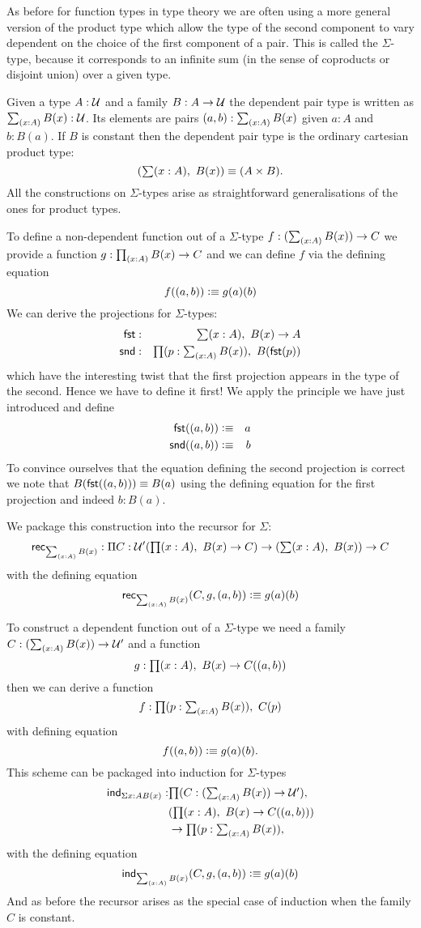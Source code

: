 As before for function types in type theory we are often using a
more general version of the product type which allow the type of
the second component to vary dependent on the choice of the first
component of a pair. This is called the $\Sigma$-type, because it
corresponds to an infinite sum (in the sense of coproducts or
disjoint union) over a given type.

Given a type $A:\mathcal{U}$ and a family $B : A \to \mathcal{U}$ the dependent
pair type is written as $\sm{x:A} B(x) : \UU$. Its elements are
pairs $\tup{a}{b} : \sm{x:A} B(x)$ given $a:A$ and $b:B(a)$.
If $B$ is constant then the dependent pair type is the
ordinary cartesian product type:
\[ (\sm{x:A} B(x)) \jdeq (A \times B).\]
All the constructions on $\Sigma$-types arise as straightforward generalisations of the ones for product types.

To define a non-dependent function out of a $\Sigma$-type
$f : (\sm{x:A} B(x)) \to C$ we provide a function 
$g : \prd{x:A} B(x) \to C$ and we can define $f$ via the defining
equation
\[ f(( a,b)) \vcentcolon\equiv g(a)(b) \]
We can derive the projections for $\Sigma$-types:
\begin{eqnarray*}
  \fst & : & \sm{x : A}B(x) \to A \\
  \snd & : & \prd{p:\sm{x : A}B(x)}B(\fst(p))
\end{eqnarray*}
which have the interesting twist that the first projection appears
in the type of the second. Hence we have to define it first!
We apply the principle we have just introduced and define
\begin{eqnarray*}
  \mathsf{fst}(( a,b)) & \vcentcolon\equiv & a \\
  \mathsf{snd}(( a,b)) & \vcentcolon\equiv & b
\end{eqnarray*}
To convince ourselves that the equation defining the second
projection is correct we note that $B (\mathsf{fst}(( a,b))) \equiv
B(a)$ using the defining equation for the first projection and
indeed $b : B(a)$. 

We package this construction into the recursor for $\Sigma$:
\[ \rec{\sm{x:A}B(x)} : \Pi{C:\UU'}(\prd{x:A} B(x) \to C) \to
(\sm{x:A}B(x)) \to C \]
with the defining equation
\[ \rec{\sm{x:A}B(x)}(C,g,\tup{a}{b}) \defeq g(a)(b) \]

To construct a dependent function out of a $\Sigma$-type we 
need a family $C : (\sm{x:A} B(x)) \to \UU'$ and a function
\[ g : \prd{x:A} B(x) \to C(\tup{a}{b}) \]
then we can derive a function 
\[ f : \prd{p : \sm{x:A}B(x)} C(p) \]
with  defining equation
\[ f(( a,b)) \vcentcolon\equiv g(a)(b).\]
This scheme can be packaged into induction for $\Sigma$-types
\begin{align*}
  \ind{\Sigma{x:A}B(x)} : & \prd{C:(\sm{x:A} B(x)) \to \UU'}\\
   & (\prd{x:A} B(x) \to C(\tup{a}{b})) \\
   & \to \prd{p : \sm{x:A}B(x)}
\end{align*}
with the defining equation 
\[ \ind{\sm{x:A}B(x)}(C,g,\tup{a}{b}) \defeq g(a)(b) \]
And as before the recursor arises as the special case of induction
when the family $C$ is constant.

